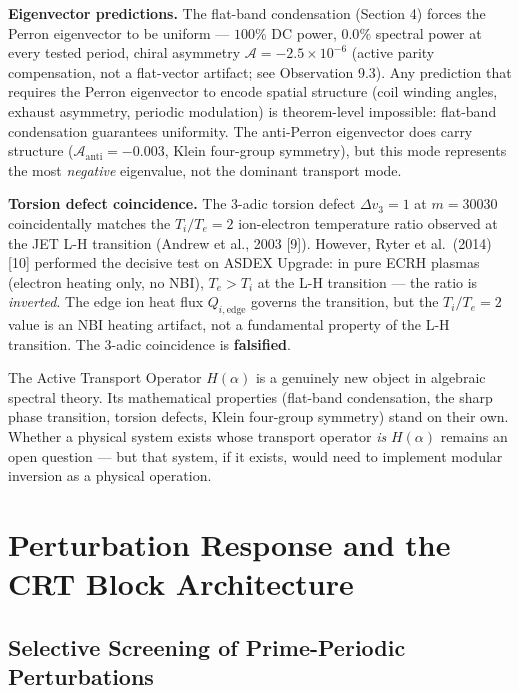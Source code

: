 \documentclass[11pt,letterpaper]{article}
\theoremstyle{definition}
\theoremstyle{remark}
\begin{document}
\textbf{Eigenvector predictions.} The flat-band condensation (Section 4) forces the Perron eigenvector to be uniform --- $100\%$ DC power, $0.0\%$ spectral power at every tested period, chiral asymmetry $\mathcal{A} = -2.5 \times 10^{-6}$ (active parity compensation, not a flat-vector artifact; see Observation 9.3). Any prediction that requires the Perron eigenvector to encode spatial structure (coil winding angles, exhaust asymmetry, periodic modulation) is theorem-level impossible: flat-band condensation guarantees uniformity. The anti-Perron eigenvector does carry structure ($\mathcal{A}_{\text{anti}} = -0.003$, Klein four-group symmetry), but this mode represents the most \emph{negative} eigenvalue, not the dominant transport mode.

\textbf{Torsion defect coincidence.} The 3-adic torsion defect $\Delta v_3 = 1$ at $m = 30030$ coincidentally matches the $T_i/T_e = 2$ ion-electron temperature ratio observed at the JET L-H transition (Andrew et al., 2003 [9]). However, Ryter et al.~(2014) [10] performed the decisive test on ASDEX Upgrade: in pure ECRH plasmas (electron heating only, no NBI), $T_e > T_i$ at the L-H transition --- the ratio is \emph{inverted}. The edge ion heat flux $Q_{i,\text{edge}}$ governs the transition, but the $T_i/T_e = 2$ value is an NBI heating artifact, not a fundamental property of the L-H transition. The 3-adic coincidence is \textbf{falsified}.

The Active Transport Operator $H(\alpha)$ is a genuinely new object in algebraic spectral theory. Its mathematical properties (flat-band condensation, the sharp phase transition, torsion defects, Klein four-group symmetry) stand on their own. Whether a physical system exists whose transport operator \emph{is} $H(\alpha)$ remains an open question --- but that system, if it exists, would need to implement modular inversion as a physical operation.

\section{Perturbation Response and the CRT Block Architecture}\label{perturbation-response-and-the-crt-block-architecture}

\subsection{Selective Screening of Prime-Periodic Perturbations}\label{selective-screening-of-prime-periodic-perturbations}
\end{document}
